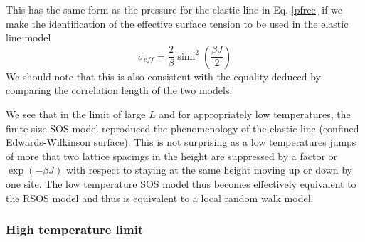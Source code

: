 This has the same form as the pressure for the elastic line in Eq. \eqref{pfree} if we make the identification of the effective surface tension to be used in the elastic line model
\begin{equation}
\sigma_{eff} = \frac{2}{\beta}\sinh^2(\frac{\beta J}{2})
\end{equation}
We should note that this is also consistent with the equality deduced by comparing the correlation length of the two models.

We see that in the limit of large $L$ and for appropriately low temperatures, the finite size SOS model reproduced the phenomenology of the elastic line (confined Edwards-Wilkinson surface). 
This is not surprising as a low temperatures jumps of more that two lattice spacings in the height are suppressed by a factor or $\exp(-\beta J)$ with respect to staying at the same height moving up or down by one site. The low temperature SOS model thus becomes effectively equivalent to the RSOS model and thus is equivalent to a local random walk model. 

\subsubsection*{High temperature limit}


